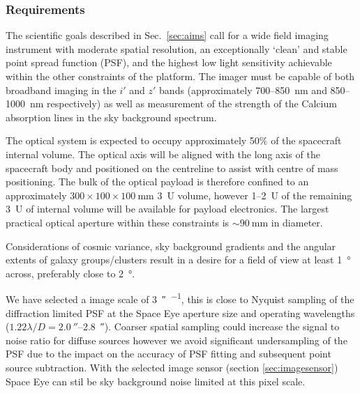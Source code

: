 \documentclass[]{iac}
\begin{document}
\subsubsection{Requirements}
\label{sec:payloadreqs}

The scientific goals described in Sec.~\ref{sec:aims} call for a wide field imaging instrument with moderate spatial
resolution, an exceptionally `clean' and stable point spread function (PSF), and the highest low light sensitivity
achievable within the other constraints of the platform. The imager must be capable of both broadband imaging in the
$i'$ and $z'$ bands (approximately 700--\SI{850}{\nano\metre} and 850--\SI{1000}{\nano\metre} respectively) as well as
measurement of the strength of the Calcium absorption lines in the sky background spectrum.

The optical system is expected to occupy approximately 50\% of the spacecraft internal volume. The optical axis will be
aligned with the long axis of the spacecraft body and positioned on the centreline to assist with centre of mass
positioning. The bulk of the optical payload is therefore confined to an approximately $300 \times 100 \times
\SI{100}{\milli\metre}$ \SI{3}{U} volume, however 1--\SI{2}{U} of the remaining \SI{3}{U} of internal volume will be
available for payload electronics. The largest practical optical aperture within these constraints is
$\sim\SI{90}{\milli\metre}$ in diameter.

Considerations of cosmic variance, sky background gradients and the angular extents of galaxy groups/clusters result in
a desire for a field of view at least \SI{1}{\degree} across, preferably close to \SI{2}{\degree}.

We have selected a image scale of \SI{3}{\arcsecond\per\pix}, this is close to Nyquist sampling of the diffraction
limited PSF at the Space Eye aperture size and operating wavelengths ($1.22 \lambda / D =
\SI{2.0}{\arcsecond}$--\SI{2.8}{\arcsecond}). Coarser spatial sampling could increase the signal to noise ratio for
diffuse sources however we avoid significant undersampling of the PSF due to the impact on the accuracy
of PSF fitting and subsequent point source subtraction. With the selected image sensor (section \ref{sec:imagesensor})
Space Eye can stil be sky background noise
limited at this pixel scale.
\end{document}
